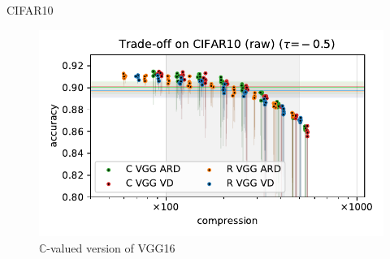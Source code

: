 \documentclass{beamer}
\newcommand{\cplx}{\mathbb{C}}
\begin{document}
\begin{frame}[c]{\insertsection}{CIFAR10}
  \begin{figure}[t]
    \centering
    \includegraphics[width=\linewidth]{figure__cifar__trade-off/appendix__augmentedcifar10__raw__-0.5.pdf}
    \\
    {$\cplx$-valued version of VGG16 \citep{simonyan_very_2015}}
  \end{figure}

\end{frame}
\end{document}
